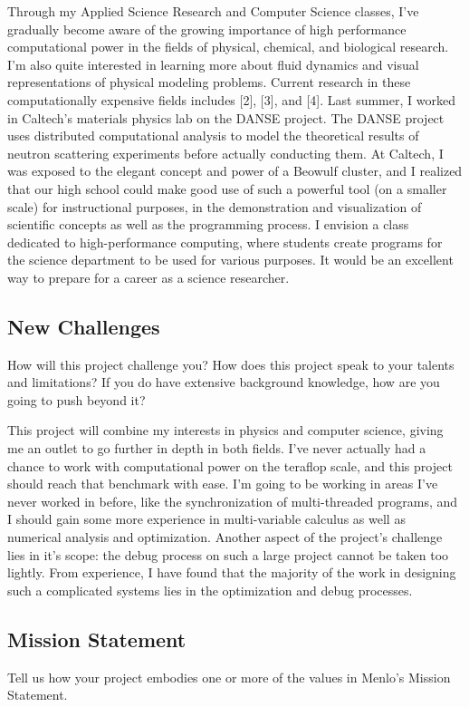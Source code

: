 \documentclass[10pt]{article}
\begin{document}
Through my Applied Science Research and Computer Science classes, I've gradually become aware of the growing importance of high performance computational power in the fields of physical, chemical, and biological research. I'm also quite interested in learning more about fluid dynamics and visual representations of physical modeling problems. Current research in these computationally expensive fields includes [2], [3], and [4]. Last summer, I worked in Caltech's materials physics lab on the DANSE project. The DANSE project uses distributed computational analysis to model the theoretical results of neutron scattering experiments before actually conducting them. At Caltech, I was exposed to the elegant concept and power of a Beowulf cluster, and I realized that our high school could make good use of such a powerful tool (on a smaller scale) for instructional purposes, in the demonstration and visualization of scientific concepts as well as the programming process. I envision a class dedicated to high-performance computing, where students create programs for the science department to be used for various purposes. It would be an excellent way to prepare  for a career as a science researcher.
	
\subsection{New Challenges}
How will this project challenge you? How does this project speak to your talents and limitations? If you do have extensive background knowledge, how are you going to push beyond it?

This project will combine my interests in physics and computer science, giving me an outlet to go further in depth in both fields. I've never actually had a chance to work with computational power on the teraflop scale, and this project should reach that benchmark with ease. I'm going to be working in areas I've never worked in before, like the synchronization of multi-threaded programs, and I should gain some more experience in multi-variable calculus as well as numerical analysis and optimization. Another aspect of the project's challenge lies in it's scope: the debug process on such a large project cannot be taken too lightly. From experience, I have found that the majority of the work in designing such a complicated systems lies in the optimization and debug processes.


\subsection{Mission Statement}
Tell us how your project embodies one or more of the values in Menlo's Mission Statement.
\end{document}
